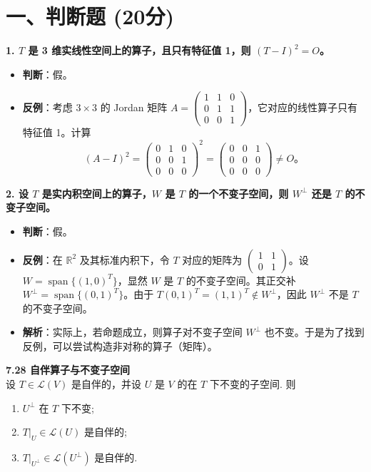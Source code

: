 \documentclass[12pt,a4paper]{article}
\DeclareMathOperator{\Span}{span}
\begin{document}
\section*{一、判断题 (20分)}

\textbf{1. $T$ 是 3 维实线性空间上的算子，且只有特征值 1，则 $(T-I)^2 = O$。}
\begin{itemize}
    \item \textbf{判断}：假。
    \item \textbf{反例}：考虑 $3 \times 3$ 的 Jordan 矩阵 $A = \begin{pmatrix} 1 & 1 & 0 \\ 0 & 1 & 1 \\ 0 & 0 & 1 \end{pmatrix}$，它对应的线性算子只有特征值 1。计算 
    $$ (A-I)^2 = \begin{pmatrix} 0 & 1 & 0 \\ 0 & 0 & 1 \\ 0 & 0 & 0 \end{pmatrix}^2 = \begin{pmatrix} 0 & 0 & 1 \\ 0 & 0 & 0 \\ 0 & 0 & 0 \end{pmatrix} \neq O。$$
\end{itemize}

\textbf{2. 设 $T$ 是实内积空间上的算子，$W$ 是 $T$ 的一个不变子空间，则 $W^\perp$ 还是 $T$ 的不变子空间。}
\begin{itemize}
    \item \textbf{判断}：假。
    \item \textbf{反例}：在 $\mathbb{R}^2$ 及其标准内积下，令 $T$ 对应的矩阵为 $\begin{pmatrix} 1 & 1 \\ 0 & 1 \end{pmatrix}$。设 $W = \Span\{(1,0)^T\}$，显然 $W$ 是 $T$ 的不变子空间。其正交补 $W^\perp = \Span\{(0,1)^T\}$。由于 $T(0,1)^T = (1,1)^T \notin W^\perp$，因此 $W^\perp$ 不是 $T$ 的不变子空间。
    \item \textbf{解析}：实际上，若命题成立，则算子对不变子空间 $W^\perp$ 也不变。于是为了找到反例，可以尝试构造非对称的算子（矩阵）。
\end{itemize}

\begin{tcolorbox}[colback=gray!10, colframe=gray!30, sharp corners]
    \textbf{7.28 自伴算子与不变子空间}\\
    设 $T \in \mathcal{L}(V)$ 是自伴的，并设 $U$ 是 $V$ 的在 $T$ 下不变的子空间. 则
    \begin{enumerate}
        \item[(a)] $U^\perp$ 在 $T$ 下不变;
        \item[(b)] $T|_U \in \mathcal{L}(U)$ 是自伴的;
        \item[(c)] $T|_{U^\perp} \in \mathcal{L}(U^\perp)$ 是自伴的.
    \end{enumerate}
\end{tcolorbox}
\end{document}
